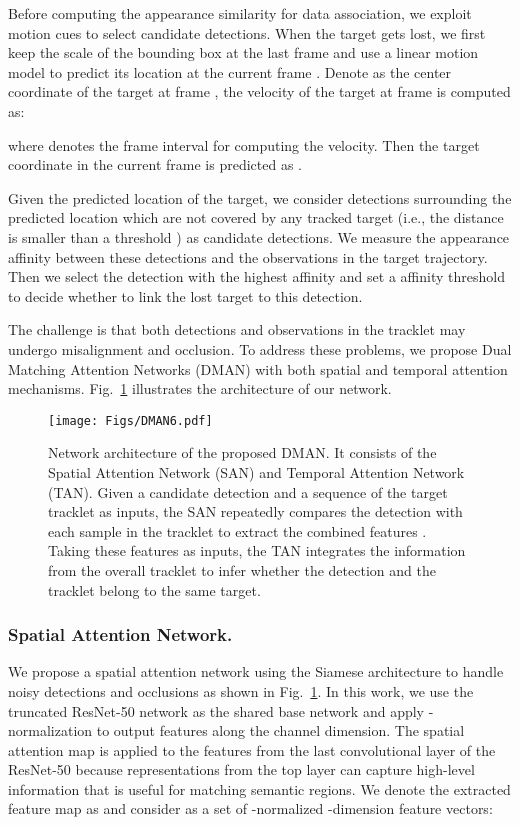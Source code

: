 \documentclass[runningheads]{llncs}
\begin{document}
  
  Before computing the appearance similarity for data association, we exploit motion cues to select candidate detections. When the target gets lost, we first keep the scale of the bounding box at the last frame  and use a linear motion model to predict its location at the current frame . Denote  as the center coordinate of the target at frame , the velocity  of the target at frame  is computed as:
  
  where  denotes the frame interval for computing the velocity. Then the target coordinate in the current frame  is predicted as .
  
  Given the predicted location of the target, we consider detections surrounding the predicted location which are not covered by any tracked target (i.e., the distance is smaller than a threshold ) as candidate detections. We measure the appearance affinity between these detections and the observations in the target trajectory. Then we select the detection with the highest affinity and set a affinity threshold  to decide whether to link the lost target to this detection.
  
  The challenge is that both detections and observations in the tracklet may undergo misalignment and occlusion. To address these problems, we propose Dual Matching Attention Networks (DMAN) with both spatial and temporal attention mechanisms. Fig.~\ref{fig:DMAN} illustrates the architecture of our network.
  \begin{figure}[t]
    \centering
    \texttt{[image: Figs/DMAN6.pdf]}\\
    \caption{Network architecture of the proposed DMAN. It consists of the Spatial Attention Network (SAN) and Temporal Attention Network (TAN). Given a candidate detection and a sequence of the target tracklet as inputs, the SAN repeatedly compares the detection with each sample in the tracklet to extract the combined features . Taking these features as inputs, the TAN integrates the information from the overall tracklet to infer whether the detection and the tracklet belong to the same target.}\label{fig:DMAN}
  \vspace{-4mm}
  \end{figure}
  \subsubsection{Spatial Attention Network.}
  We propose a spatial attention network using the Siamese architecture to handle noisy detections and occlusions as shown in Fig.~\ref{fig:DMAN}. 
In this work, we use the truncated ResNet-50 network \cite{ResNet} as the shared base network and apply -normalization to output features along the channel dimension. 
The spatial attention map is applied to the features from the last convolutional layer of the ResNet-50 because representations from the top layer can capture high-level information that is useful for matching semantic regions. 
We denote the extracted feature map as  and consider  as a set of -normalized -dimension feature vectors:
  
\end{document}
